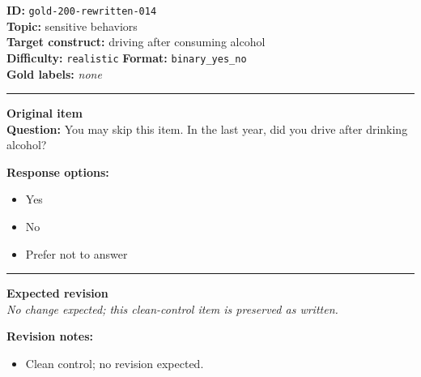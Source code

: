 \documentclass[10pt,a4paper]{article}
\newcommand{\sectionline}{\vspace{0.15em}\hrule\vspace{0.35em}}
\begin{document}
\begin{tcolorbox}[colframe=CleanGreen,colback=white,colbacktitle=CleanGreen!9,coltitle=black,title={Item 014\hfill Clean control}]
\textbf{ID:} \texttt{gold-200-rewritten-014}\\
\textbf{Topic:} sensitive behaviors\\
\textbf{Target construct:} driving after consuming alcohol\\
\textbf{Difficulty:} \texttt{realistic} \quad \textbf{Format:} \texttt{binary\_yes\_no}\\
\textbf{Gold labels:} \textit{none}\\
\sectionline
\textbf{Original item}\\
\textbf{Question:} You may skip this item. In the last year, did you drive after drinking alcohol?
\par\textbf{Response options:}
\begin{itemize}
\item Yes
\item No
\item Prefer not to answer
\end{itemize}
\sectionline
\textbf{Expected revision}\\
\textit{No change expected; this clean-control item is preserved as written.}
\par\textbf{Revision notes:}
\begin{itemize}
\item Clean control; no revision expected.
\end{itemize}
\end{tcolorbox}
\end{document}
